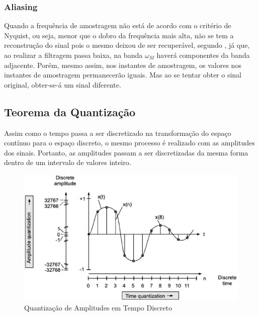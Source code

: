 \subsubsection{Aliasing}
Quando a frequência de amostragem não está de acordo com o critério de Nyquist, ou seja, menor que o dobro da frequência mais alta, não se tem a reconstrução do sinal pois o mesmo deixou de ser recuperável, segundo \cite{oppenheim2010sinais}, já que, ao realizar a filtragem passa baixa, na banda $\omega_M$ haverá componentes da banda adjacente. Porém, mesmo assim, nos instantes de amostragem, os valores nos instantes de amostragem permanecerão iguais. Mas ao se tentar obter o sinal original, obter-se-á um sinal diferente.

\subsection{Teorema da Quantização}

Assim como o tempo passa a ser discretizado na transformação do espaço contínuo para o espaço discreto, o mesmo processo é realizado com as amplitudes dos sinais. Portanto, as amplitudes passam a ser discretizadas da mesma forma dentro de um intervalo de valores inteiro. 

\begin{figure}[h]
	\centering
    \includegraphics[scale=0.4]{figuras/fig04.eps}
	\caption{Quantização de Amplitudes em Tempo Discreto}
	\label{fig04}
\end{figure}

